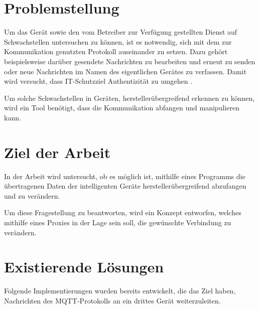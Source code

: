 \section{Problemstellung}
Um das Gerät sowie den vom Betreiber zur Verfügung gestellten Dienst auf Schwachstellen untersuchen zu können, ist es notwendig, sich mit dem zur Kommunikation genutzten Protokoll auseinander zu setzen. Dazu gehört beispielsweise darüber gesendete Nachrichten zu bearbeiten und erneut zu senden oder neue Nachrichten im Namen des eigentlichen Gerätes zu verfassen. Damit wird versucht, dass IT-Schutzziel Authentizität zu umgehen \cite{Bedner2010}.
    
Um solche Schwachstellen in Geräten, herstellerübergreifend erkennen zu können, wird ein Tool benötigt, dass die Kommunikation abfangen und manipulieren kann.

\section{Ziel der Arbeit}
    In der Arbeit wird untersucht, ob es möglich ist, mithilfe eines Programms die übertragenen Daten der intelligenten Geräte herstellerübergreifend abzufangen und zu verändern.

    Um diese Fragestellung zu beantworten, wird ein Konzept entworfen, welches mithilfe eines Proxies in der Lage sein soll, die gewünschte Verbindung zu verändern. %
    
\section{Existierende Lösungen}
    Folgende Implementierungen wurden bereits entwickelt, die das Ziel haben, Nachrichten des \ac{MQTT}-Protokolls an ein drittes Gerät weiterzuleiten.
    
